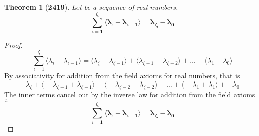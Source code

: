 \documentclass[preview]{standalone}
\newtheorem{theorem}{Theorem}
\begin{document}
\begin{theorem}[\textbf{2419}]
    Let \bm{$\{\lambda_\zeta\}$} be a sequence of real numbers.
    \begin{equation*}
        \bm{
            \sum_{\iota=1}^\zeta \big \langle 
                \lambda_\iota - \lambda_{\iota-1}
            \big \rangle
                = 
            \lambda_\zeta - \lambda_0
        }
    \end{equation*}
\end{theorem}

\begin{proof}
    \begin{equation*}
        \sum_{\iota=1}^\zeta \big \langle
            \lambda_\iota - \lambda_{\iota-1}
        \big \rangle
            =
        \big \langle \lambda_\zeta - \lambda_{\zeta-1} \big \rangle 
            + 
        \big \langle \lambda_{\zeta-1} - \lambda_{\zeta-2} \big \rangle 
            + 
        \dots 
            + 
        \big \langle \lambda_1 - \lambda_0 \big \rangle
    \end{equation*}
    By associativity for addition from the field axioms for real numbers, that is 
    \begin{equation*}
        \lambda_\zeta 
            + 
        \big \langle -\lambda_{\zeta-1} + \lambda_{\zeta-1} \big \rangle
            + 
        \big \langle -\lambda_{\zeta-2} + \lambda_{\zeta-2} \big \rangle
            + 
        \dots 
            + 
        \big \langle -\lambda_1 + \lambda_1 \big \rangle
            + 
        -\lambda_0
    \end{equation*}
    The inner terms cancel out 
    by the inverse law for addition from the field axioms 
    $\therefore$
    \begin{equation*}
        \bm{
            \sum_{\iota=1}^\zeta \big \langle 
                \lambda_\iota - \lambda_{\iota-1}
            \big \rangle
                = 
            \lambda_\zeta - \lambda_0
        }
    \end{equation*} 
\end{proof}
\end{document}

